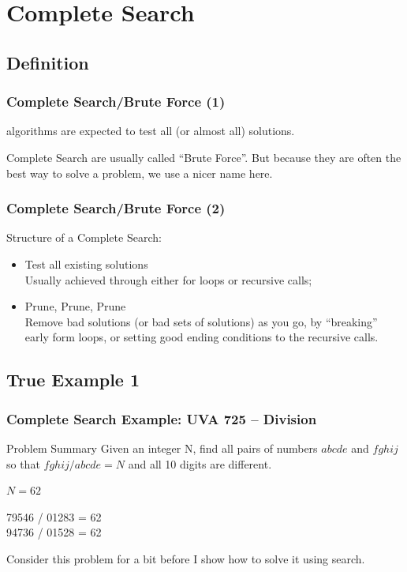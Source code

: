 \documentclass{beamer}
\begin{document}
\section{Complete Search}
\subsection{Definition}
\begin{frame}
  \frametitle{Complete Search/Brute Force (1)}

   algorithms are expected to test all (or
  almost all) solutions.

  \bigskip

  \begin{exampleblock}{}
  Complete Search are usually called ``Brute Force''. But because they
  are often the best way to solve a problem, we use a nicer name here.
  \end{exampleblock}
\end{frame}


\begin{frame}
  \frametitle{Complete Search/Brute Force (2)}

  Structure of a Complete Search:

  \bigskip

  \begin{itemize}
  \item Test all existing solutions\\
    Usually achieved through either for loops or recursive calls;

    \bigskip

  \item Prune, Prune, Prune\\
    Remove bad solutions (or bad sets of solutions) as you go, by
    ``breaking'' early form loops, or setting good ending conditions
    to the recursive calls.
  \end{itemize}

\end{frame}

\subsection{True Example 1}
\begin{frame}
  \frametitle{Complete Search Example: UVA 725 -- Division}
  \begin{block}{Problem Summary}
    Given an integer N, find all pairs of numbers $abcde$ and $fghij$ so that
    $fghij/abcde = N$ and all 10 digits are different.

    \bigskip

     $N = 62$

    \medskip

    79546 / 01283 = 62\\
    94736 / 01528 = 62\\
  \end{block}

  \vfill

  Consider this problem for a bit before I show how to solve it using search.
\end{frame}
\end{document}
